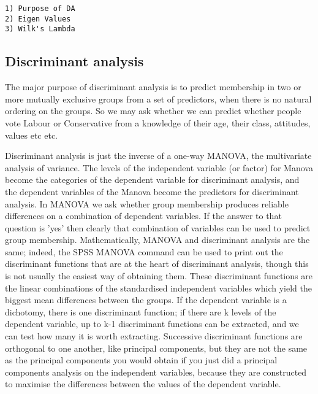 
\begin{verbatim}
1) Purpose of DA
2) Eigen Values
3) Wilk's Lambda
\end{verbatim}

\subsection{Discriminant analysis}


The major purpose of discriminant analysis is to predict membership in two or more mutually exclusive groups from a set of predictors, when there is no natural ordering on the groups. So we may ask whether we can predict whether people vote Labour or Conservative from a knowledge of their age, their class, attitudes, values etc etc.

Discriminant analysis is just the inverse of a one-way MANOVA, the multivariate analysis of variance. The levels of the independent variable (or factor) for Manova become the categories of the dependent variable for discriminant analysis, and the dependent variables of the Manova become the predictors for discriminant analysis. In MANOVA we ask whether group membership produces reliable differences on a combination of dependent variables. If the answer to that question is 'yes' then clearly that combination of variables can be used to predict group membership. Mathematically, MANOVA and discriminant analysis are the same; indeed, the SPSS MANOVA command can be used to print out the discriminant functions that are at the heart of discriminant analysis, though this is not usually the easiest way of obtaining them. These discriminant functions are the linear combinations of the standardised independent variables which yield the biggest mean differences between the groups. If the dependent variable is a dichotomy, there is one discriminant function; if there are k levels of the dependent variable, up to k-1 discriminant functions can be extracted, and we can test how many it is worth extracting. Successive discriminant functions are orthogonal to one another, like principal components, but they are not the same as the principal components you would obtain if you just did a principal components analysis on the independent variables, because they are constructed to maximise the differences between the values of the dependent variable.


